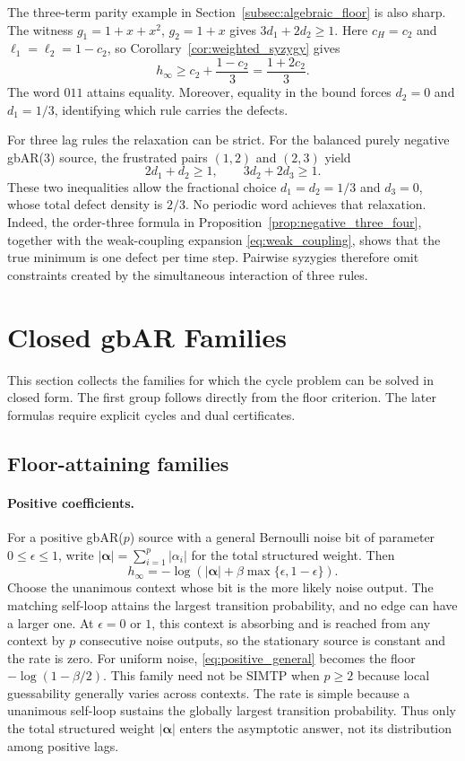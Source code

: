 \documentclass[11pt,a4paper]{article}
\begin{document}
The three-term parity example in Section~\ref{subsec:algebraic_floor}
is also sharp.  The witness $g_1=1+x+x^2$, $g_2=1+x$ gives
$3d_1+2d_2\ge1$.  Here $c_H=c_2$ and
$\ell_1=\ell_2=1-c_2$, so Corollary~\ref{cor:weighted_syzygy} gives
\[
    h_\infty\ge c_2+\frac{1-c_2}{3}=\frac{1+2c_2}{3}.
\]
The word $011$ attains equality.  Moreover, equality in the bound
forces $d_2=0$ and $d_1=1/3$, identifying which rule carries the
defects.

For three lag rules the relaxation can be strict.  For the balanced purely
negative gbAR(3) source, the frustrated pairs $(1,2)$ and $(2,3)$
yield
\[
    2d_1+d_2\ge1,
    \qquad
    3d_2+2d_3\ge1.
\]
These two inequalities allow the fractional choice
$d_1=d_2=1/3$ and $d_3=0$, whose total defect density is $2/3$.
No periodic word achieves that relaxation.  Indeed, the order-three
formula in Proposition~\ref{prop:negative_three_four}, together with
the weak-coupling expansion \eqref{eq:weak_coupling}, shows that the
true minimum is one defect per time step.  Pairwise
syzygies therefore omit constraints created by the simultaneous
interaction of three rules.

\section{Closed gbAR Families}
\label{sec:families}

This section collects the families for which the cycle problem can be
solved in closed form.  The first group follows directly from the floor
criterion.  The later formulas require explicit cycles and dual
certificates.

\subsection{Floor-attaining families}

\paragraph{Positive coefficients.}
For a positive gbAR($p$) source with a general Bernoulli noise bit of
parameter $0\le\epsilon\le1$, write
$|\boldsymbol\alpha|=\sum_{i=1}^p|\alpha_i|$ for the total structured
weight.  Then
\begin{equation}
\label{eq:positive_general}
    h_\infty
    =-\log\left(
        |\boldsymbol\alpha|
        +\beta\max\{\epsilon,1-\epsilon\}
      \right).
\end{equation}
Choose the unanimous context whose bit is the more likely noise output.
The matching self-loop attains the largest transition probability, and
no edge can have a larger one.  At $\epsilon=0$ or $1$, this context
is absorbing and is reached from any context by $p$ consecutive noise
outputs, so the stationary source is constant and the rate is zero.
For uniform noise,
\eqref{eq:positive_general} becomes the floor
$-\log(1-\beta/2)$.  This family need not be SIMTP when $p\ge2$ because local
guessability generally varies across contexts.  The rate is simple
because a unanimous self-loop sustains the globally largest transition
probability.  Thus only the total structured weight
$|\boldsymbol\alpha|$ enters the asymptotic answer, not its distribution
among positive lags.
\end{document}
